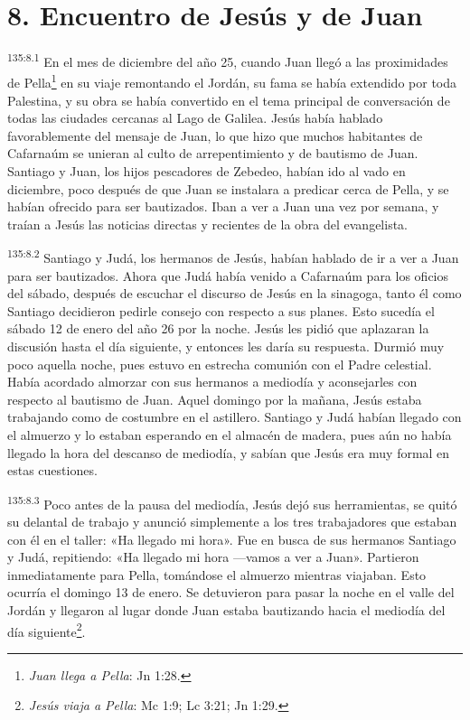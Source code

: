 \section*{8. Encuentro de Jesús y de Juan}
\par 
\textsuperscript{135:8.1} En el mes de diciembre del año 25, cuando Juan llegó a las proximidades de Pella\footnote{\textit{Juan llega a Pella}: Jn 1:28.} en su viaje remontando el Jordán, su fama se había extendido por toda Palestina, y su obra se había convertido en el tema principal de conversación de todas las ciudades cercanas al Lago de Galilea. Jesús había hablado favorablemente del mensaje de Juan, lo que hizo que muchos habitantes de Cafarnaúm se unieran al culto de arrepentimiento y de bautismo de Juan. Santiago y Juan, los hijos pescadores de Zebedeo, habían ido al vado en diciembre, poco después de que Juan se instalara a predicar cerca de Pella, y se habían ofrecido para ser bautizados. Iban a ver a Juan una vez por semana, y traían a Jesús las noticias directas y recientes de la obra del evangelista.

\par 
\textsuperscript{135:8.2} Santiago y Judá, los hermanos de Jesús, habían hablado de ir a ver a Juan para ser bautizados. Ahora que Judá había venido a Cafarnaúm para los oficios del sábado, después de escuchar el discurso de Jesús en la sinagoga, tanto él como Santiago decidieron pedirle consejo con respecto a sus planes. Esto sucedía el sábado 12 de enero del año 26 por la noche. Jesús les pidió que aplazaran la discusión hasta el día siguiente, y entonces les daría su respuesta. Durmió muy poco aquella noche, pues estuvo en estrecha comunión con el Padre celestial. Había acordado almorzar con sus hermanos a mediodía y aconsejarles con respecto al bautismo de Juan. Aquel domingo por la mañana, Jesús estaba trabajando como de costumbre en el astillero. Santiago y Judá habían llegado con el almuerzo y lo estaban esperando en el almacén de madera, pues aún no había llegado la hora del descanso de mediodía, y sabían que Jesús era muy formal en estas cuestiones.

\par 
\textsuperscript{135:8.3} Poco antes de la pausa del mediodía, Jesús dejó sus herramientas, se quitó su delantal de trabajo y anunció simplemente a los tres trabajadores que estaban con él en el taller: «Ha llegado mi hora». Fue en busca de sus hermanos Santiago y Judá, repitiendo: «Ha llegado mi hora ---vamos a ver a Juan». Partieron inmediatamente para Pella, tomándose el almuerzo mientras viajaban. Esto ocurría el domingo 13 de enero. Se detuvieron para pasar la noche en el valle del Jordán y llegaron al lugar donde Juan estaba bautizando hacia el mediodía del día siguiente\footnote{\textit{Jesús viaja a Pella}: Mc 1:9; Lc 3:21; Jn 1:29.}.


